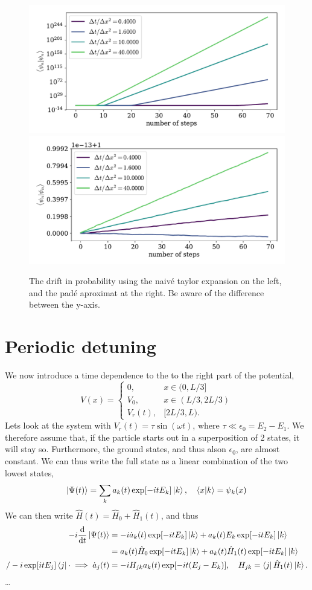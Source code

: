\documentclass{article}
\begin{document}
    \begin{figure}[ht]
        \centering
        \includegraphics[width=.49\textwidth]{box_w_barrier/step_errorlog.pdf}
        \includegraphics[width=.49\textwidth]{box_w_barrier/step_error.pdf}
        \caption{The drift in probability using the naivé taylor expansion on the left, and the padé aproximat at the right. Be aware of the difference between the y-axis.}
        \label{fig:step_error}
        
    \end{figure}

\section*{Periodic detuning}
    We now introduce a time dependence to the to the right part of the potential, 
    \begin{equation*}
        V(x) = 
        \begin{cases}
            0, & x \in (0, L/3] \\
            V_0, & x \in (L/3, 2L/3) \\
            V_r(t), & [2L/3, L).
        \end{cases}
    \end{equation*}
    Lets look at the system with $V_r(t) = \tau \sin(\omega t)$, where $\tau \ll \epsilon_0 = E_2 - E_1$. We therefore assume that, if the particle starts out in a superposition of 2 states, it will stay so. Furthermore, the ground states, and thus alson $\epsilon_0$, are almost constant. We can thus write the full state as a linear combination of the two lowest states, 
    \begin{equation*}
        \ket{\Psi(t)} = \sum_k a_k(t) \exp[-itE_k] \ket{k}, \quad \braket{x}{k} = \psi_k(x)
    \end{equation*}
    We can then write $\hat H(t) = \hat H_0 + \hat H_1(t)$, and thus
    \begin{align*}
        -i\dv{t}\ket{\Psi(t)} 
        & = -i\dot a_k(t)\exp[-itE_k]\ket{k} + a_k(t)E_k\exp[-itE_k]\ket{k} \\ 
        & = a_k(t)\hat H_0\exp[-itE_k] \ket{k} + a_k(t)\hat H_1(t)\exp[-itE_k] \ket{k} \\
        / -i\exp[itE_j]\bra{j} \cdot \implies \dot a_j(t) & = -i H_{jk} a_k(t)\exp[-it(E_j-E_k)], \quad H_{jk} = \bra{j} \hat H_1(t) \ket{k}.
    \end{align*}
    \dots
\end{document}
